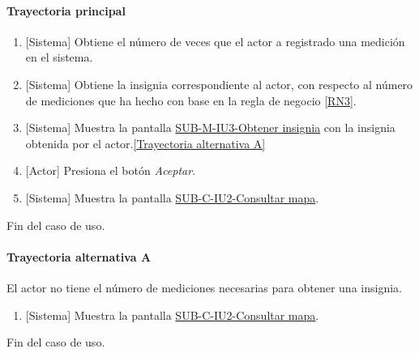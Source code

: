 \paragraph{Trayectoria principal}
	\begin{enumerate}
		\item {[Sistema]} Obtiene el número de veces que el actor a registrado una medición en el sistema.
		\item {[Sistema]} Obtiene la insignia correspondiente al actor, con respecto al número de mediciones que ha hecho con base en la regla de negocio \ref{RN3}.
		\item {[Sistema]} Muestra la pantalla \hyperref[fig:sub-m-iu1.1.3]{SUB-M-IU3-Obtener insignia} con la insignia obtenida por el actor.\hyperref[SUB-M-CU1.1.3:TA]{[Trayectoria alternativa A]}
		\item {[Actor]} Presiona el botón \textit{Aceptar}.
		\item {[Sistema]} Muestra la pantalla \hyperref[fig:sub-c-iu2]{SUB-C-IU2-Consultar mapa}.
	\end{enumerate}
	Fin del caso de uso.

\paragraph{Trayectoria alternativa A} \label{SUB-M-CU1.1.3:TA}
	El actor no tiene el número de mediciones necesarias para obtener una insignia.
	\begin{enumerate}[label=A\arabic*.]
		\item {[Sistema]} Muestra la pantalla \hyperref[fig:sub-c-iu2]{SUB-C-IU2-Consultar mapa}.
	\end{enumerate}
	Fin del caso de uso.